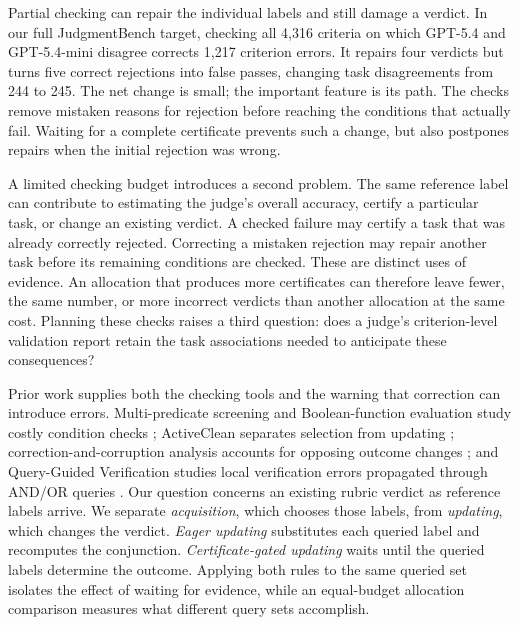 \documentclass[10pt,letterpaper]{article}
\begin{document}
Partial checking can repair the individual labels and still damage a verdict. In our full JudgmentBench target, checking all 4,316 criteria on which GPT-5.4 and GPT-5.4-mini disagree corrects 1,217 criterion errors. It repairs four verdicts but turns five correct rejections into false passes, changing task disagreements from 244 to 245. The net change is small; the important feature is its path. The checks remove mistaken reasons for rejection before reaching the conditions that actually fail. Waiting for a complete certificate prevents such a change, but also postpones repairs when the initial rejection was wrong.

A limited checking budget introduces a second problem. The same reference label can contribute to estimating the judge's overall accuracy, certify a particular task, or change an existing verdict. A checked failure may certify a task that was already correctly rejected. Correcting a mistaken rejection may repair another task before its remaining conditions are checked. These are distinct uses of evidence. An allocation that produces more certificates can therefore leave fewer, the same number, or more incorrect verdicts than another allocation at the same cost. Planning these checks raises a third question: does a judge's criterion-level validation report retain the task associations needed to anticipate these consequences?

Prior work supplies both the checking tools and the warning that correction can introduce errors. Multi-predicate screening and Boolean-function evaluation study costly condition checks \citep{krivosheev2018hybrid,gkenosis2022sbfe}; ActiveClean separates selection from updating \citep{krishnan2016activeclean}; correction-and-corruption analysis accounts for opposing outcome changes \citep{reitich2026correction}; and Query-Guided Verification studies local verification errors propagated through AND/OR queries \citep{schreiber2026queryguided}. Our question concerns an existing rubric verdict as reference labels arrive. We separate \emph{acquisition}, which chooses those labels, from \emph{updating}, which changes the verdict. \emph{Eager updating} substitutes each queried label and recomputes the conjunction. \emph{Certificate-gated updating} waits until the queried labels determine the outcome. Applying both rules to the same queried set isolates the effect of waiting for evidence, while an equal-budget allocation comparison measures what different query sets accomplish.
\end{document}
